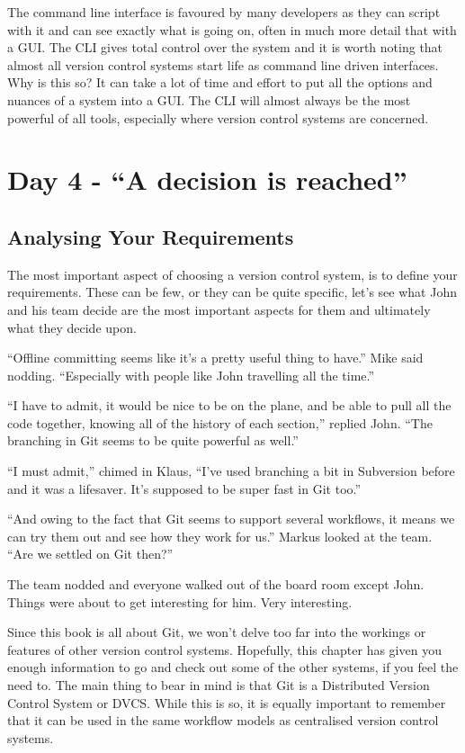 The command line interface is favoured by many developers as they can script with it and can see exactly what is going on, often in much more detail that with a GUI.
The CLI gives total control over the system and it is worth noting that almost all version control systems start life as command line driven interfaces.
Why is this so? It can take a lot of time and effort to put all the options and nuances of a system into a GUI.
The CLI will almost always be the most powerful of all tools, especially where version control systems are concerned.

\section{Day 4 - ``A decision is reached''}

\subsection{Analysing Your Requirements}

The most important aspect of choosing a version control system, is to define your requirements.
These can be few, or they can be quite specific, let's see what John and his team decide are the most important aspects for them and ultimately what they decide upon.

\begin{trenches}
``Offline committing seems like it's a pretty useful thing to have.'' Mike said nodding.
``Especially with people like John travelling all the time.''

``I have to admit, it would be nice to be on the plane, and be able to pull all the code together, knowing all of the history of each section,'' replied John.
``The branching in Git seems to be quite powerful as well.''

``I must admit,'' chimed in Klaus, ``I've used branching a bit in Subversion before and it was a lifesaver.
It's supposed to be super fast in Git too.''

``And owing to the fact that Git seems to support several workflows, it means we can try them out and see how they work for us.'' Markus looked at the team.
``Are we settled on Git then?''

The team nodded and everyone walked out of the board room except John.
Things were about to get interesting for him.
Very interesting.
\end{trenches}

Since this book is all about Git, we won't delve too far into the workings or features of other version control systems.
Hopefully, this chapter has given you enough information to go and check out some of the other systems, if you feel the need to.
The main thing to bear in mind is that Git is a Distributed Version Control System or DVCS.
While this is so, it is equally important to remember that it can be used in the same workflow models as centralised version control systems.

